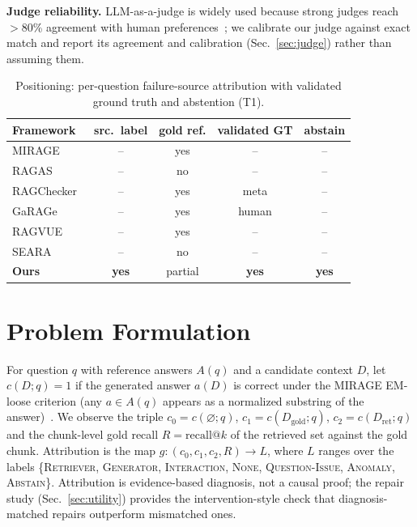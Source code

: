 \documentclass[conference]{IEEEtran}
\begin{document}
\textbf{Judge reliability.} LLM-as-a-judge is widely used because strong
judges reach $>$80\% agreement with human
preferences~\cite{zheng2023mtbench}; we calibrate our judge against exact
match and report its agreement and calibration (Sec.~\ref{sec:judge})
rather than assuming them.

\begin{table}[t]
\caption{Positioning: per-question failure-source attribution with validated
ground truth and abstention (T1).}
\label{tab:positioning}
\small
\setlength{\tabcolsep}{4pt}
\begin{tabular}{lcccc}
\toprule
Framework & src.\ label & gold ref. & validated GT & abstain \\
\midrule
MIRAGE~\cite{park2025mirage} & -- & yes & -- & -- \\
RAGAS~\cite{es2024ragas} & -- & no & -- & -- \\
RAGChecker~\cite{ru2024ragchecker} & -- & yes & meta & -- \\
GaRAGe~\cite{sorodoc2025garage} & -- & yes & human & -- \\
RAGVUE~\cite{murugaraj2026ragvue} & -- & yes & -- & -- \\
SEARA~\cite{zou2025seara} & -- & no & -- & -- \\
\textbf{Ours} & \textbf{yes} & partial & \textbf{yes} & \textbf{yes} \\
\bottomrule
\end{tabular}
\end{table}

\section{Problem Formulation}
For question $q$ with reference answers $A(q)$ and a candidate context $D$,
let $c(D;q)=1$ if the generated answer $a(D)$ is correct under the MIRAGE
EM-loose criterion (any $a\in A(q)$ appears as a normalized substring of the
answer)~\cite{park2025mirage}. We observe the triple
$c_0=c(\varnothing;q)$, $c_1=c(D_{\text{gold}};q)$, $c_2=c(D_{\text{ret}};q)$
and the chunk-level gold recall $R=\mathrm{recall@}k$ of the retrieved set
against the gold chunk. Attribution is the map
$g:(c_0,c_1,c_2,R)\rightarrow L$, where $L$ ranges over the labels
\{\textsc{Retriever}, \textsc{Generator}, \textsc{Interaction},
\textsc{None}, \textsc{Question-Issue}, \textsc{Anomaly},
\textsc{Abstain}\}.
Attribution is evidence-based diagnosis, not a causal proof; the repair
study (Sec.~\ref{sec:utility}) provides the intervention-style check that
diagnosis-matched repairs outperform mismatched ones.
\end{document}
